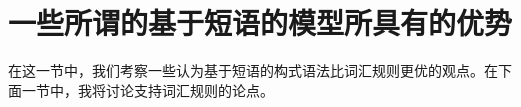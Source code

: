 
\section{一些所谓的基于短语的模型所具有的优势}
\label{Abschnitt-Stoepselei}
%

    在这一节中，我们考察一些认为基于短语的构式语法比词汇规则更优的观点。在下面一节中，我将讨论支持词汇规则的论点。

